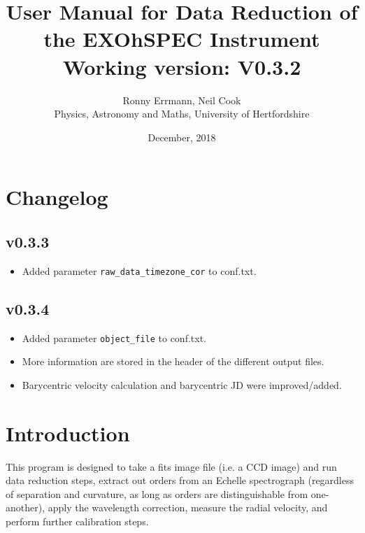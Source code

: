 \documentclass[10pt,a4paper]{article}
\title{User Manual for Data Reduction of the EXOhSPEC Instrument \\ Working version: V0.3.2}
\date{December, 2018}
\author{Ronny Errmann, Neil Cook\\ Physics, Astronomy and Maths, University of Hertfordshire}
\begin{document}
\maketitle

\tableofcontents
{}


\section{Changelog}
\subsection{v0.3.3}
\begin{itemize}
 \item Added parameter \verb|raw_data_timezone_cor| to conf.txt.
\end{itemize}

\subsection{v0.3.4}
\begin{itemize}
 \item Added parameter \verb|object_file| to conf.txt.
 \item More information are stored in the header of the different output files.
 \item Barycentric velocity calculation and barycentric JD were improved/added.
\end{itemize}

\newpage

\section{Introduction}
\label{intro}




This program is designed to take a fits image file (i.e. a CCD image) and run data reduction steps, extract out orders from an Echelle spectrograph (regardless of separation and curvature, as long as orders are distinguishable from one-another), apply the wavelength correction, measure the radial velocity, and perform further calibration steps. 
\end{document}
